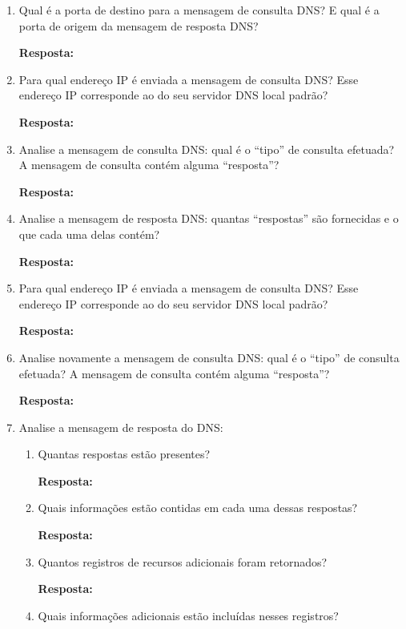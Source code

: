 \documentclass[12pt,a4paper]{report}
\begin{document}
\begin{enumerate}
		\item Qual é a porta de destino para a mensagem de consulta DNS? E qual é a porta de origem da mensagem de resposta DNS?
		
		\textbf{Resposta:}

		\item Para qual endereço IP é enviada a mensagem de consulta DNS? Esse endereço IP corresponde ao do seu servidor DNS local padrão?
		
		\textbf{Resposta:}

		\item Analise a mensagem de consulta DNS: qual é o “tipo” de consulta efetuada? A mensagem de consulta contém alguma “resposta”?
		
		\textbf{Resposta:}

		\item Analise a mensagem de resposta DNS: quantas “respostas” são fornecidas e o que cada uma delas contém?
		
		\textbf{Resposta:}

		\item Para qual endereço IP é enviada a mensagem de consulta DNS? Esse endereço IP corresponde ao do seu servidor DNS local padrão?
		
		\textbf{Resposta:}

		\item Analise novamente a mensagem de consulta DNS: qual é o “tipo” de consulta efetuada? A mensagem de consulta contém alguma “resposta”?
		
		\textbf{Resposta:}

		\item Analise a mensagem de resposta do DNS:
		
		\begin{enumerate}
			\item Quantas respostas estão presentes?
			
			\textbf{Resposta:}

			\item Quais informações estão contidas em cada uma dessas respostas?
			
			\textbf{Resposta:}

			\item Quantos registros de recursos adicionais foram retornados?
			
			\textbf{Resposta:}

			\item Quais informações adicionais estão incluídas nesses registros?
			

\end{enumerate}
\end{enumerate}
\end{document}
